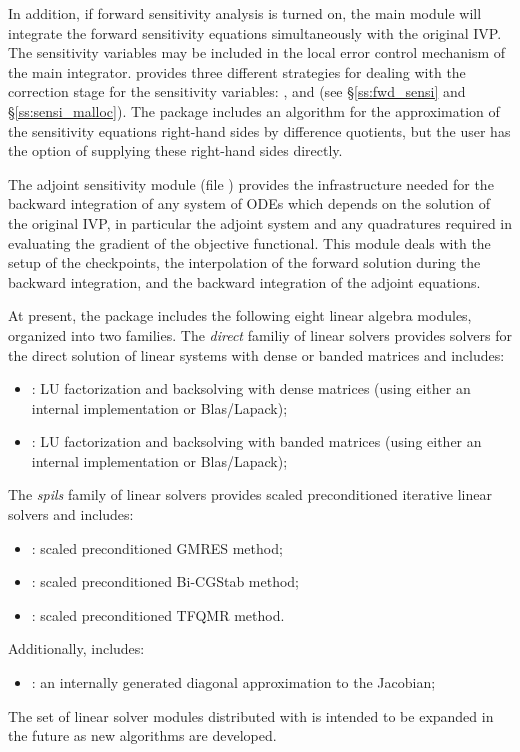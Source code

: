 In addition, if forward sensitivity analysis is turned on, the main module 
will integrate the forward sensitivity equations simultaneously with the original
IVP. The sensitivity variables may be included in the local error control
mechanism of the main integrator.
{\cvodes} provides three different strategies for dealing with the correction
stage for the sensitivity variables: ,  and
 (see \S\ref{ss:fwd_sensi} and \S\ref{ss:sensi_malloc}).
The {\cvodes} package includes an algorithm for the approximation of the
sensitivity equations right-hand sides by difference quotients, but the user has
the option of supplying these right-hand sides directly.

The adjoint sensitivity module (file ) provides the infrastructure needed for the 
backward integration of any system of ODEs which depends on the solution 
of the original IVP, in particular the adjoint system and any quadratures required
in evaluating the gradient of the objective functional.  This module deals with
the setup of the checkpoints, the interpolation of the forward solution during
the backward integration, and the backward integration of the adjoint equations.


At present, the package includes the following eight {\cvodes} linear algebra
modules, organized into two families. The {\em direct} familiy of linear
solvers provides solvers for the direct solution of linear systems with
dense or banded matrices and includes:
\begin{itemize} 
\item {\cvdense}: LU factorization and backsolving with dense matrices
  (using either an internal implementation or Blas/Lapack); 
\item {\cvband}: LU factorization and backsolving with banded matrices
  (using either an internal implementation or Blas/Lapack); 
\end{itemize}
The {\em spils} family of linear solvers provides scaled preconditioned
iterative linear solvers and includes:
\begin{itemize} 
\item {\cvspgmr}: scaled preconditioned GMRES method;
\item {\cvspbcg}: scaled preconditioned Bi-CGStab method;
\item {\cvsptfqmr}: scaled preconditioned TFQMR method.
\end{itemize}
Additionally, {\cvode} includes:
\begin{itemize}
\item {\cvdiag}: an internally generated diagonal approximation to the 
  Jacobian; 
\end{itemize}
The set of linear solver modules distributed with {\cvodes} is intended to be expanded in the
future as new algorithms are developed.

